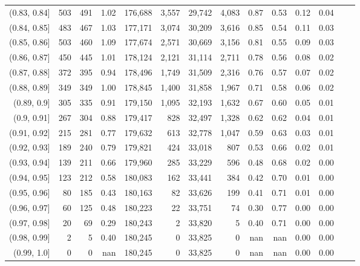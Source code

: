 \begin{tabular}{rrrrrrrrrrrrrr}
(0.83, 0.84]   &    503 &  491 &    1.02 &  176,688 &    3,557 &  29,742 &   4,083 &  0.87 &  0.53 &  0.12 &      0.04 \\
(0.84, 0.85]   &    483 &  467 &    1.03 &  177,171 &    3,074 &  30,209 &   3,616 &  0.85 &  0.54 &  0.11 &      0.03 \\
(0.85, 0.86]   &    503 &  460 &    1.09 &  177,674 &    2,571 &  30,669 &   3,156 &  0.81 &  0.55 &  0.09 &      0.03 \\
(0.86, 0.87]   &    450 &  445 &    1.01 &  178,124 &    2,121 &  31,114 &   2,711 &  0.78 &  0.56 &  0.08 &      0.02 \\
(0.87, 0.88]   &    372 &  395 &    0.94 &  178,496 &    1,749 &  31,509 &   2,316 &  0.76 &  0.57 &  0.07 &      0.02 \\
(0.88, 0.89]   &    349 &  349 &    1.00 &  178,845 &    1,400 &  31,858 &   1,967 &  0.71 &  0.58 &  0.06 &      0.02 \\
(0.89, 0.9]    &    305 &  335 &    0.91 &  179,150 &    1,095 &  32,193 &   1,632 &  0.67 &  0.60 &  0.05 &      0.01 \\
(0.9, 0.91]    &    267 &  304 &    0.88 &  179,417 &      828 &  32,497 &   1,328 &  0.62 &  0.62 &  0.04 &      0.01 \\
(0.91, 0.92]   &    215 &  281 &    0.77 &  179,632 &      613 &  32,778 &   1,047 &  0.59 &  0.63 &  0.03 &      0.01 \\
(0.92, 0.93]   &    189 &  240 &    0.79 &  179,821 &      424 &  33,018 &     807 &  0.53 &  0.66 &  0.02 &      0.01 \\
(0.93, 0.94]   &    139 &  211 &    0.66 &  179,960 &      285 &  33,229 &     596 &  0.48 &  0.68 &  0.02 &      0.00 \\
(0.94, 0.95]   &    123 &  212 &    0.58 &  180,083 &      162 &  33,441 &     384 &  0.42 &  0.70 &  0.01 &      0.00 \\
(0.95, 0.96]   &     80 &  185 &    0.43 &  180,163 &       82 &  33,626 &     199 &  0.41 &  0.71 &  0.01 &      0.00 \\
(0.96, 0.97]   &     60 &  125 &    0.48 &  180,223 &       22 &  33,751 &      74 &  0.30 &  0.77 &  0.00 &      0.00 \\
(0.97, 0.98]   &     20 &   69 &    0.29 &  180,243 &        2 &  33,820 &       5 &  0.40 &  0.71 &  0.00 &      0.00 \\
(0.98, 0.99]   &      2 &    5 &    0.40 &  180,245 &        0 &  33,825 &       0 &   nan &   nan &  0.00 &      0.00 \\
(0.99, 1.0]    &      0 &    0 &     nan &  180,245 &        0 &  33,825 &       0 &   nan &   nan &  0.00 &      0.00 \\
\bottomrule
\end{tabular}
